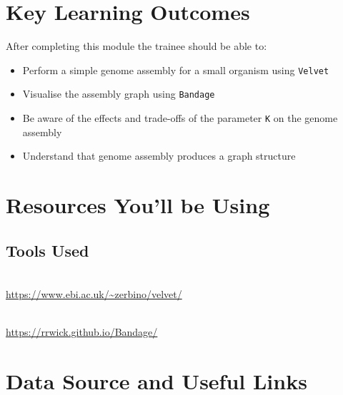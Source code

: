 

\section{Key Learning Outcomes}

After completing this module the trainee should be able to:
\begin{itemize}
  \item Perform a simple genome assembly for a small organism using \texttt{Velvet}
  \item Visualise the assembly graph using \texttt{Bandage}
  \item Be aware of the effects and trade-offs of the parameter \texttt{K} on the genome assembly
  \item Understand that genome assembly produces a graph structure
\end{itemize}

\section{Resources You'll be Using}

\subsection{Tools Used}
\begin{description}[style=multiline,labelindent=0cm,align=left,leftmargin=0.5cm]
  \item[Velvet]\hfill\\
  	\url{https://www.ebi.ac.uk/~zerbino/velvet/}
  \item[Bandage]\hfill\\
  	\url{https://rrwick.github.io/Bandage/}
\end{description}

\section{Data Source and Useful Links}


